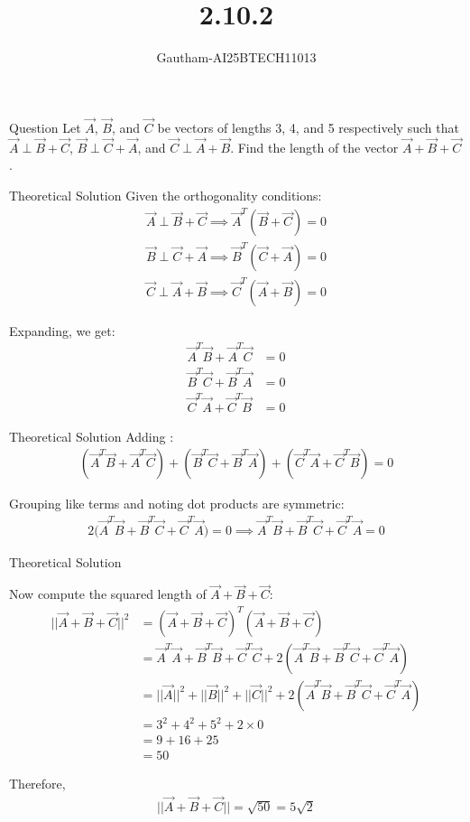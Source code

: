 \documentclass{beamer}
\title %
{2.10.2}
\author %
{Gautham-AI25BTECH11013}
\begin{document}
\frame{\titlepage}
\begin{frame}{Question}
Let $\Vec{A}$, $\Vec{B}$, and $\Vec{C}$ be vectors of lengths 3, 4, and 5 respectively such that
$\Vec{A} \perp \Vec{B} + \Vec{C}$, 
$\Vec{B} \perp \Vec{C} + \Vec{A}$, and
$\Vec{C} \perp \Vec{A} + \Vec{B}$. Find the length of the vector $\Vec{A} + \Vec{B} + \Vec{C}$.\\
\end{frame}
\begin{frame}{Theoretical Solution}
Given the orthogonality conditions:
\begin{align}
\Vec{A} \perp \Vec{B} + \Vec{C} \implies \Vec{A}^T (\Vec{B} + \Vec{C}) = 0 \\
\Vec{B} \perp \Vec{C} + \Vec{A} \implies \Vec{B}^T (\Vec{C} + \Vec{A}) = 0 \\
\Vec{C} \perp \Vec{A} + \Vec{B} \implies \Vec{C}^T (\Vec{A} + \Vec{B}) = 0
\end{align}

Expanding, we get:
\begin{align}
\Vec{A}^T \Vec{B} + \Vec{A}^T \Vec{C} &= 0 \\
\Vec{B}^T \Vec{C} + \Vec{B}^T \Vec{A} &= 0  \\
\Vec{C}^T \Vec{A} + \Vec{C}^T \Vec{B} &= 0 
\end{align}
\end{frame}
\begin{frame}{Theoretical Solution}
   Adding :
\begin{align}
(\Vec{A}^T \Vec{B} + \Vec{A}^T \Vec{C}) + (\Vec{B}^T \Vec{C} + \Vec{B}^T \Vec{A}) + (\Vec{C}^T \Vec{A} + \Vec{C}^T \Vec{B}) = 0
\end{align}

Grouping like terms and noting dot products are symmetric:
\begin{align}
2 \big( \Vec{A}^T \Vec{B} + \Vec{B}^T \Vec{C} + \Vec{C}^T \Vec{A} \big) = 0 \implies \Vec{A}^T \Vec{B} + \Vec{B}^T \Vec{C} + \Vec{C}^T \Vec{A} = 0
\end{align}
\end{frame}
\begin{frame}{Theoretical Solution}
 
Now compute the squared length of $\Vec{A} + \Vec{B} + \Vec{C}$:
\begin{align}
||\Vec{A} + \Vec{B} + \Vec{C}||^2 &= (\Vec{A} + \Vec{B} + \Vec{C})^T (\Vec{A} + \Vec{B} + \Vec{C}) \\
&= \Vec{A}^T \Vec{A} + \Vec{B}^T \Vec{B} + \Vec{C}^T \Vec{C} + 2(\Vec{A}^T \Vec{B} + \Vec{B}^T \Vec{C} + \Vec{C}^T \Vec{A}) \\
&=||\Vec{A}||^2+||\Vec{B}||^2+||\Vec{C}||^2 + 2(\Vec{A}^T \Vec{B} + \Vec{B}^T \Vec{C} + \Vec{C}^T \Vec{A}) \\
&= 3^2 + 4^2 + 5^2 + 2 \times 0 \\
&= 9 + 16 + 25 \\
&= 50
\end{align}

Therefore,
\begin{align}
||\Vec{A} + \Vec{B} + \Vec{C}||= \sqrt{50} = 5 \sqrt{2}
\end{align}
\end{frame}
\end{document}
